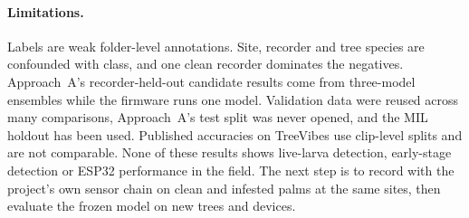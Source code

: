 \paragraph{Limitations.} Labels are weak folder-level annotations. Site, recorder and tree species are confounded with class, and one clean recorder dominates the negatives. Approach~A's recorder-held-out candidate results come from three-model ensembles while the firmware runs one model. Validation data were reused across many comparisons, Approach~A's test split was never opened, and the MIL holdout has been used. Published accuracies on TreeVibes \cite{karar2021,karar2022} use clip-level splits and are not comparable. None of these results shows live-larva detection, early-stage detection or ESP32 performance in the field. The next step is to record with the project's own sensor chain on clean and infested palms at the same sites, then evaluate the frozen model on new trees and devices.
\endgroup
